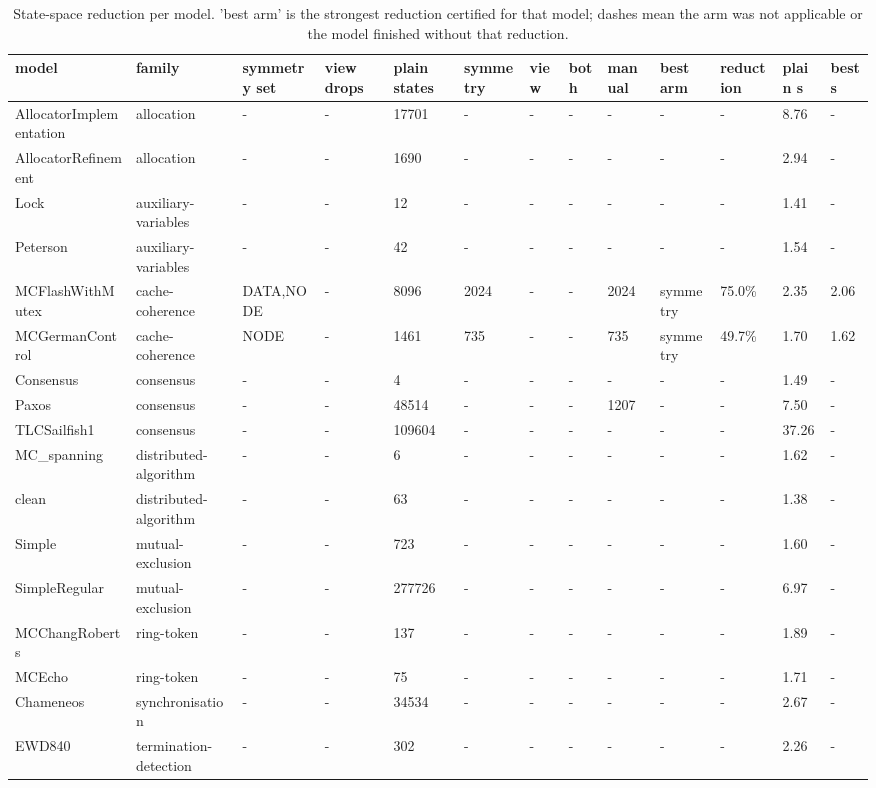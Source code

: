 \begin{table}[t]
\centering
\caption{State-space reduction per model.  'best arm' is the strongest reduction certified for that model; dashes mean the arm was not applicable or the model finished without that reduction.}
\label{tab:rq1}
\small
\begin{tabular}{lllllllllllll}
\toprule
model & family & symmetry set & view drops & plain states & symmetry & view & both & manual & best arm & reduction & plain s & best s \\
\midrule
AllocatorImplementation & allocation & - & - & 17701 & - & - & - & - & - & - & 8.76 & - \\
AllocatorRefinement & allocation & - & - & 1690 & - & - & - & - & - & - & 2.94 & - \\
Lock & auxiliary-variables & - & - & 12 & - & - & - & - & - & - & 1.41 & - \\
Peterson & auxiliary-variables & - & - & 42 & - & - & - & - & - & - & 1.54 & - \\
MCFlashWithMutex & cache-coherence & DATA,NODE & - & 8096 & 2024 & - & - & 2024 & symmetry & 75.0\% & 2.35 & 2.06 \\
MCGermanControl & cache-coherence & NODE & - & 1461 & 735 & - & - & 735 & symmetry & 49.7\% & 1.70 & 1.62 \\
Consensus & consensus & - & - & 4 & - & - & - & - & - & - & 1.49 & - \\
Paxos & consensus & - & - & 48514 & - & - & - & 1207 & - & - & 7.50 & - \\
TLCSailfish1 & consensus & - & - & 109604 & - & - & - & - & - & - & 37.26 & - \\
MC\_spanning & distributed-algorithm & - & - & 6 & - & - & - & - & - & - & 1.62 & - \\
clean & distributed-algorithm & - & - & 63 & - & - & - & - & - & - & 1.38 & - \\
Simple & mutual-exclusion & - & - & 723 & - & - & - & - & - & - & 1.60 & - \\
SimpleRegular & mutual-exclusion & - & - & 277726 & - & - & - & - & - & - & 6.97 & - \\
MCChangRoberts & ring-token & - & - & 137 & - & - & - & - & - & - & 1.89 & - \\
MCEcho & ring-token & - & - & 75 & - & - & - & - & - & - & 1.71 & - \\
Chameneos & synchronisation & - & - & 34534 & - & - & - & - & - & - & 2.67 & - \\
EWD840 & termination-detection & - & - & 302 & - & - & - & - & - & - & 2.26 & - \\

\end{tabular}
\end{table}
